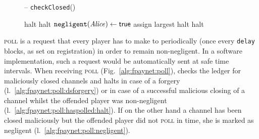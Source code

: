 \begin{figure}[H]
\begin{systembox}{\fpaynet{} -- \texttt{checkClosed}()}
\begin{algorithmic}[1]
              \State halt 
              \label{alg:fpaynet:close:func:dsforgery}
              \label{alg:fpaynet:close:func:ifmalicious}
                \State halt
                \label{alg:fpaynet:close:func:malicious}
              \Else
                \State $\mathtt{negligent}(\mathit{Alice}) \gets \mathsf{true}$
              \EndIf
              \State assign largest 
            \label{alg:fpaynet:close:func:ifidle}
              \State halt
              \label{alg:fpaynet:close:func:idle}
            \EndIf
          \EndFor
            \State halt
            \label{alg:fpaynet:close:func:balance}
          \EndIf
        \EndFunction
        \label{alg:fpaynet:close:func:end}
      \end{algorithmic}
    \end{systembox}
    \caption{}
    \label{alg:fpaynet:close:func}
  \end{figure}

  \textsc{poll} is a request that every player has to make to \fpaynet{}
  periodically (once every \texttt{delay} blocks, as set on registration) in
  order to remain non-negligent. In a software implementation, such a request
  would be automatically sent at safe time intervals. When receiving
  \textsc{poll} (Fig.~\ref{alg:fpaynet:poll}), \fpaynet{} checks the ledger for
  maliciously closed channels and halts in case of a forgery
  (l.~\ref{alg:fpaynet:poll:dsforgery}) or in case of a successful malicious
  closing of a channel whilst the offended player was non-negligent
  (l.~\ref{alg:fpaynet:poll:haspolled:halt}). If on the other hand a channel has
  been closed maliciously but the offended player did not \textsc{poll} in time,
  she is marked as negligent (l.~\ref{alg:fpaynet:poll:negligent}).

